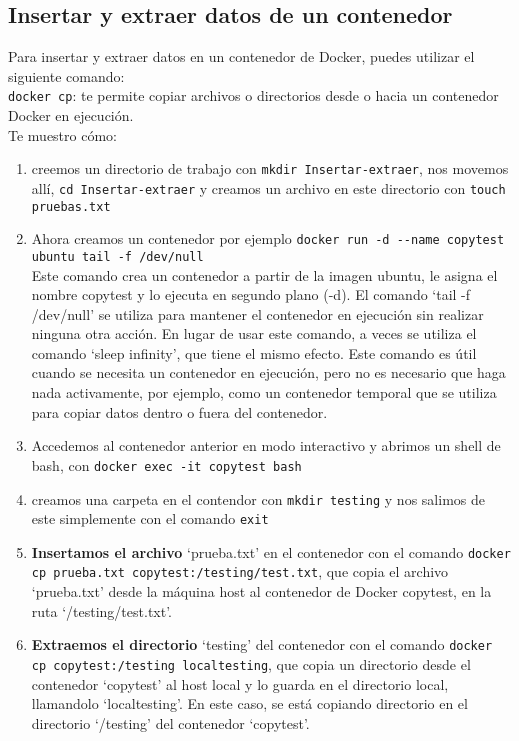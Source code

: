 \documentclass{article}
\begin{document}
\subsection{Insertar y extraer datos de un contenedor}
Para insertar y extraer datos en un contenedor de Docker, puedes utilizar el siguiente comando:\\
\lstinline{docker cp}: te permite copiar archivos o directorios desde o hacia un contenedor Docker en ejecución.\\
Te muestro cómo:
\begin{enumerate}
      \item creemos un directorio de trabajo con \lstinline{mkdir Insertar-extraer}, nos movemos allí, \lstinline{cd Insertar-extraer} y creamos un archivo en este directorio con \lstinline{touch pruebas.txt}
      \item Ahora creamos un contenedor por ejemplo \lstinline{docker run -d --name copytest ubuntu tail -f /dev/null}\\
      Este comando crea un contenedor a partir de la imagen ubuntu, le asigna el nombre copytest y lo ejecuta en segundo plano (-d). El comando \enquote*{tail -f /dev/null} se utiliza para mantener el contenedor en ejecución sin realizar ninguna otra acción. En lugar de usar este comando, a veces se utiliza el comando \enquote*{sleep infinity}, que tiene el mismo efecto. Este comando es útil cuando se necesita un contenedor en ejecución, pero no es necesario que haga nada activamente, por ejemplo, como un contenedor temporal que se utiliza para copiar datos dentro o fuera del contenedor.
      \item Accedemos al contenedor anterior en modo interactivo y abrimos un shell de bash, con \lstinline{docker exec -it copytest bash}
      \item creamos una carpeta en el contendor con \lstinline{mkdir testing} y nos salimos de este simplemente con el comando \lstinline{exit}
      \item \textbf{Insertamos el archivo} \enquote*{prueba.txt} en el contenedor con el comando \lstinline{docker cp prueba.txt copytest:/testing/test.txt}, que copia el archivo \enquote*{prueba.txt} desde la máquina host al contenedor de Docker copytest, en la ruta \enquote*{/testing/test.txt}. 
      \item \textbf{Extraemos el directorio} \enquote*{testing} del contenedor con el comando \lstinline{docker cp copytest:/testing localtesting}, que copia un directorio desde el contenedor \enquote*{copytest} al host local y lo guarda en el directorio local, llamandolo \enquote*{localtesting}. En este caso, se está copiando directorio en el directorio \enquote*{/testing} del contenedor \enquote*{copytest}.
\end{enumerate}
\end{document}
